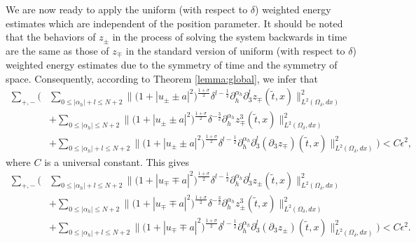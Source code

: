 \documentclass[10pt,reqno]{amsart}
\numberwithin{equation}{section}
\begin{document}
We are now ready to apply the  uniform (with respect to $\delta$) weighted energy estimates  which are independent of the position parameter. It should be noted that  the behaviors of $z_\pm$ in the process of solving the system backwards in time are the same as those of $z_\mp$ in the standard version of  uniform (with respect to $\delta$) weighted energy estimates due to the symmetry of time and the symmetry of space.
Consequently, according to Theorem \ref{lemma:global}, we infer that 
		\begin{align*} 
	\sum_{+,-}\bigg(&\sum_{0\leqslant|\alpha_h|+l\leqslant N+2}\Big\|\big(1+|u_\pm\pm a|^2\big)^{\frac{1+\sigma}{2}}\delta^{l-\frac{1}{2}}\partial_h^{\alpha_h}\partial_3^lz_{\mp}(\widetilde{t},x)\Big\|_{L^2(\Omega_{\delta},dx)}^2\\
		&+\sum_{0\leqslant|\alpha_h|\leqslant N+2}\Big\|\big(1+|u_\pm\pm a|^2\big)^{\frac{1+\sigma}{2}}\delta^{-\frac{3}{2}}\partial_h^{\alpha_h}z^3_{\mp}(\widetilde{t},x)\Big\|_{L^2(\Omega_{\delta},dx)}^2\\
		&+\sum_{0\leqslant|\alpha_h|+l\leqslant N+2}\Big\|\big(1+|u_\pm\pm a|^2\big)^{\frac{1+\sigma}{2}}\delta^{l-\frac{1}{2}}\partial_h^{\alpha_h}\partial_3^l(\partial_3z_{\mp})(\widetilde{t},x)\Big\|_{L^2(\Omega_{\delta},dx)}^2\bigg)<C\epsilon^2,
	\end{align*}
	where $C$ is a universal constant. This gives 
\begin{align*} 
	\sum_{+,-}\bigg(&\sum_{0\leqslant|\alpha_h|+l\leqslant N+2}\Big\|\big(1+|u_\mp\mp a|^2\big)^{\frac{1+\sigma}{2}}\delta^{l-\frac{1}{2}}\partial_h^{\alpha_h}\partial_3^lz_{\pm}(\widetilde{t},x)\Big\|_{L^2(\Omega_{\delta},dx)}^2\\
	&+\sum_{0\leqslant|\alpha_h|\leqslant N+2}\Big\|\big(1+|u_\mp\mp a|^2\big)^{\frac{1+\sigma}{2}}\delta^{-\frac{3}{2}}\partial_h^{\alpha_h}z^3_{\pm}(\widetilde{t},x)\Big\|_{L^2(\Omega_{\delta},dx)}^2\\
	&+\sum_{0\leqslant|\alpha_h|+l\leqslant N+2}\Big\|\big(1+|u_\mp\mp a|^2\big)^{\frac{1+\sigma}{2}}\delta^{l-\frac{1}{2}}\partial_h^{\alpha_h}\partial_3^l(\partial_3z_{\pm})(\widetilde{t},x)\Big\|_{L^2(\Omega_{\delta},dx)}^2\bigg)<C\epsilon^2.
\end{align*}
\end{document}

